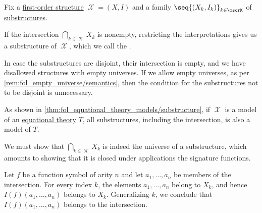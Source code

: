 \begin{definition}\label{def:fol_intersection_substructure}\mimprovised
  Fix a \hyperref[def:fol_structure]{first-order structure} \( \mscrX = (X, I) \) and a family \( \seq{ (X_k, I_k) }_{k \in \mscrK} \) of \hyperref[def:fol_substructure]{substructures}.

  If the intersection \( \bigcap_{k \in \mscrK} X_k \) is nonempty, restricting the interpretations gives us a substructure of \( \mscrX \), which we call the .
\end{definition}
\begin{comments}
  \item In case the substructures are disjoint, their intersection is empty, and we have disallowed structures with empty universes. If we allow empty universes, as per \cref{rem:fol_empty_universe/semantics}, then the condition for the substructures not to be disjoint is unnecessary.

  \item As shown in \cref{thm:fol_equational_theory_models/substructure}, if \( \mscrX \) is a model of an \hyperref[def:fol_equational_theory]{equational theory} \( T \), all substructures, including the intersection, is also a model of \( T \).
\end{comments}
\begin{defproof}
  We must show that \( \bigcap_{k \in \mscrK} X_k \) is indeed the universe of a substructure, which amounts to showing that it is closed under applications the signature functions.

  Let \( f \) be a function symbol of arity \( n \) and let \( a_1, \ldots, a_n \) be members of the intersection. For every index \( k \), the elements \( a_1, \ldots, a_n \) belong to \( X_k \), and hence \( I(f)(a_1, \ldots, a_n) \) belongs to \( X_k \). Generalizing \( k \), we conclude that \( I(f)(a_1, \ldots, a_n) \) belongs to the intersection.
\end{defproof}

